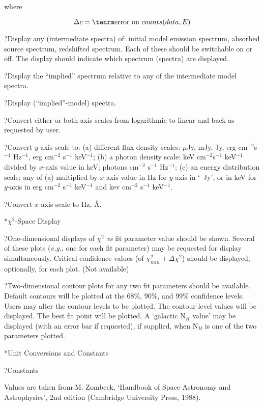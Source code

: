 \itemitem{}where

$$\Delta c = {\rm error~on}~counts(data, E)$$

\??Display any (intermediate spectra) of:  initial model emission
spectrum, absorbed source spectrum,
redshifted spectrum.  Each of these should be switchable
on or off.  The display should indicate which spectrum (spectra) are displayed.

\??Display the ``implied'' spectrum relative to any of the
intermediate model spectra.

\??Display (``implied''-model) spectra.

\??Convert either or both axis scales from logarithmic to linear and back as
requested by user.

\??Convert $y$-axis scale to: (a) different flux density scales: $\mu$Jy, mJy,
Jy, erg cm$^{-2}$s$^{-1}$ Hz$^{-1}$, erg cm$^{-2}$ s$^{-1}$ keV$^{-1}$;
(b) a photon density scale: keV cm$^{-2}$s$^{-1}$ keV$^{-1}$ divided by $x$-axis
value in keV; photons cm$^{-2}$ s$^{-1}$ Hz$^{-1}$; (c) an energy
distribution scale:  any of (a) multiplied by $x$-axis value in Hz for 
$y$-axis in `~Jy', or in keV for
$y$-axis in erg cm$^{-2}$ s$^{-1}$ keV$^{-1}$ and kev cm$^{-2}$ s$^{-1}$ keV$^{-1}$.

\??Convert $x$-axis scale to Hz, \AA.

\**$\chi^{2}$-Space Display

\??One-dimensional displays of $\chi^{2}$ {\it vs} fit parameter value
should be shown.  Several of these plots ({\it e.g.}, one for each fit parameter)
may be requested for display simultaneously.  Critical confidence values
(of $\chi^{2}_{min}+\Delta\chi^{2}$) should be displayed, optionally, for each
plot. (Not available)

\??Two-dimensional contour plots for any two fit parameters should be
available.  Default contours will be plotted at the 68$\%$, 90$\%$, and 99$\%$
confidence levels.
Users may alter the contour levels to be plotted.  The contour-level
values will be displayed.  The best fit point will be plotted.  A `galactic N$_{H}$
value' may be displayed (with an error bar if requested), if supplied, when
N$_{H}$ is one of the two parameters plotted.

\**Unit Conversions and Constants

\??Constants

{\listlist

Values are taken from M. Zombeck, `Handbook of Space Astronomy and Astrophysics', 2nd
edition (Cambridge University Press, 1988).

}

